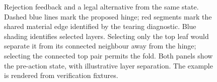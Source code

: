 \begin{figure}[tbp]
\centering
{}
\caption{Rejection feedback and a legal alternative from the same state. Dashed blue
lines mark the proposed hinge; red segments mark the shared material edge identified
by the tearing diagnostic. Blue shading identifies selected layers. Selecting only
the top leaf would separate it from its connected neighbour away from the hinge;
selecting the connected top pair permits the fold. Both panels show the pre-action
state, with illustrative layer separation. The example is rendered from verification fixtures.}
\label{fig:rejection-feedback}
\end{figure}
